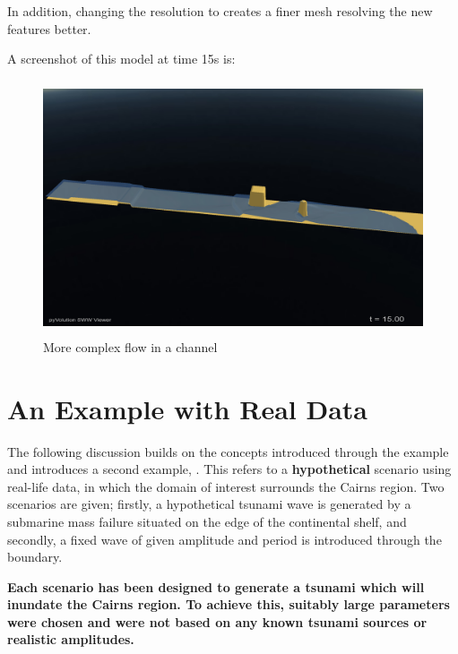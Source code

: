 \documentclass{manual}
\begin{document}
In addition, changing the resolution to  creates a finer mesh resolving the new features better.

A screenshot of this model at time 15s is:
\begin{figure}[htp]
  \centerline{\includegraphics[height=75mm]
    {graphics/channel3.png}}
  \caption{More complex flow in a channel}
  \label{fig:channel3}
\end{figure}


\section{An Example with Real Data}

\label{sec:realdataexample} The following discussion builds on the
concepts introduced through the  example and
introduces a second example, .  This refers to
a {\bf hypothetical} scenario using real-life data,
in which the domain of interest surrounds the
Cairns region. Two scenarios are given; firstly, a
hypothetical tsunami wave is generated by a submarine mass failure
situated on the edge of the continental shelf, and secondly, a fixed wave
of given amplitude and period is introduced through the boundary.

{\bf
Each scenario has been designed to generate a tsunami which will
inundate the Cairns region. To achieve this, suitably large
parameters were chosen and were not based on any known tsunami sources
or realistic amplitudes.
}
\end{document}
